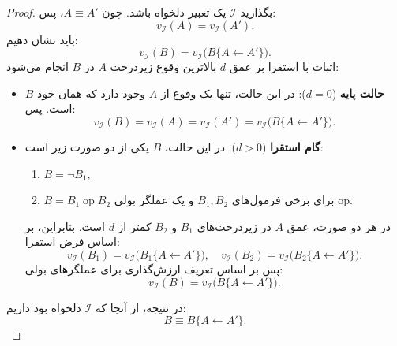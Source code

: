       \begin{proof}
        بگذارید $\mathscr{I}$ یک تعبیر دلخواه باشد. چون $A \equiv A'$، پس:
        \[
        v_{\mathscr{I}}(A) = v_{\mathscr{I}}(A').
        \]
        باید نشان دهیم:
        \[
        v_{\mathscr{I}}(B)
        =
        v_{\mathscr{I}}\bigl(B\{A \leftarrow A'\}\bigr).
        \]
        اثبات با استقرا بر عمق $d$ بالاترین وقوع زیردرخت $A$ در $B$ انجام می‌شود:
        
        \begin{itemize}
          \item \textbf{حالت پایه} ($d = 0$):  
            در این حالت، تنها یک وقوع از $A$ وجود دارد که همان خود $B$ است. پس:
            \[
            v_{\mathscr{I}}(B)
            = v_{\mathscr{I}}(A)
            = v_{\mathscr{I}}(A')
            = v_{\mathscr{I}}\bigl(B\{A \leftarrow A'\}\bigr).
            \]
          \item \textbf{گام استقرا} ($d > 0$):  
            در این حالت، $B$ یکی از دو صورت زیر است:
            \begin{enumerate}
              \item $B = \neg B_1$,
              \item $B = B_1\;\mathrm{op}\;B_2$ برای برخی فرمول‌های $B_1, B_2$ و یک عملگر بولی $\mathrm{op}$.
            \end{enumerate}
            در هر دو صورت، عمق $A$ در زیردرخت‌های $B_1$ و $B_2$ کمتر از $d$ است. بنابراین، بر اساس فرض استقرا:
            \[
            v_{\mathscr{I}}(B_1)
            = v_{\mathscr{I}}\bigl(B_1\{A \leftarrow A'\}\bigr),
            \quad
            v_{\mathscr{I}}(B_2)
            = v_{\mathscr{I}}\bigl(B_2\{A \leftarrow A'\}\bigr).
            \]
            پس بر اساس تعریف ارزش‌گذاری برای عملگرهای بولی:
            \[
            v_{\mathscr{I}}(B)
            = v_{\mathscr{I}}\bigl(B\{A \leftarrow A'\}\bigr).
            \]
        \end{itemize}
        در نتیجه، از آنجا که $\mathscr{I}$ دلخواه بود داریم:
        \[
        B \equiv B\{A \leftarrow A'\}.
        \]
      \end{proof}